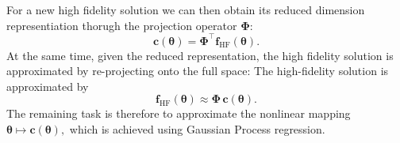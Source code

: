\documentclass{elsarticle}
\begin{document}
For a new high fidelity solution we can then obtain its reduced dimension representiation thorugh the projection operator $\boldsymbol{\Phi}$:
\begin{equation}
\mathbf c(\boldsymbol{\theta})
=
\mathbf\Phi^{\top}
\mathbf f_{\mathrm{HF}}(\boldsymbol{\theta}).
\end{equation}
At the same time, given the reduced representation, the high fidelity solution is approximated by re-projecting onto the full space:
The high-fidelity solution is approximated by
\begin{equation}
\mathbf f_{\mathrm{HF}}(\boldsymbol{\theta})
\approx
\mathbf\Phi\,\mathbf c(\boldsymbol{\theta}).
\end{equation}
The remaining task is therefore to approximate the nonlinear mapping
$
\boldsymbol{\theta}
\longmapsto
\mathbf c(\boldsymbol{\theta}),
$
which is achieved using Gaussian Process regression.
\end{document}
